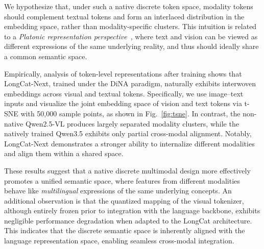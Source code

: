We hypothesize that, under such a native discrete token space, modality tokens should complement textual tokens and form an interlaced distribution in the embedding space, rather than modality-specific clusters. This intuition is related to a \textit{Platonic representation perspective}~\cite{huh2024platonic}, where text and vision can be viewed as different expressions of the same underlying reality, and thus should ideally share a common semantic space.


Empirically, analysis of token-level representations after training shows that LongCat-Next, trained under the DiNA paradigm, naturally exhibits interwoven embeddings across visual and textual tokens. Specifically, we use image–text inputs and visualize the joint embedding space of vision and text tokens via t-SNE with 50,000 sample points, as shown in Fig.~\ref{fig:tsne}. In contrast, the non-native Qwen2.5-VL produces largely separated modality clusters, while the natively trained Qwen3.5 exhibits only partial cross-modal alignment. Notably, LongCat-Next demonstrates a stronger ability to internalize different modalities and align them within a shared space.

These results suggest that a native discrete multimodal design more effectively promotes a unified semantic space, where features from different modalities behave like \textit{multilingual} expressions of the same underlying concepts. An additional observation is that the quantized mapping of the visual tokenizer, although entirely frozen prior to integration with the language backbone, exhibits negligible performance degradation when adapted to the LongCat architecture. This indicates that the discrete semantic space is inherently aligned with the language representation space, enabling seamless cross-modal integration.

